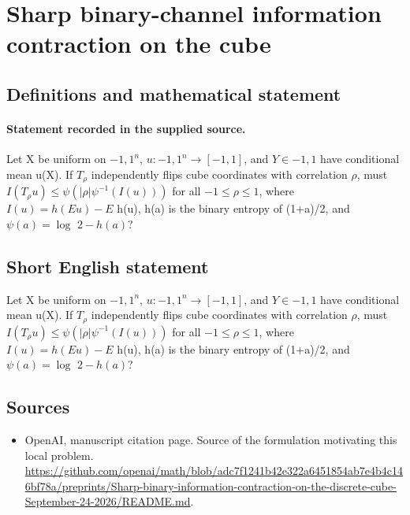 \documentclass[11pt]{article}
\begin{document}
\section*{Sharp binary-channel information contraction on the cube}\label{statement}
\subsection{Definitions and mathematical statement}
\paragraph{Statement recorded in the supplied source.}
Let X be uniform on ${-1,1}^n$, $u:{-1,1}^n\to [-1,1]$, and $Y\in {-1,1}$ have conditional mean u(X). If $T_\rho $ independently flips cube coordinates with correlation $\rho $, must $I(T_\rho u)\leq \psi (|\rho |\psi ^{-1}(I(u)))$ for all $-1\leq \rho \leq 1$, where $I(u)=h(Eu)-E$ h(u), h(a) is the binary entropy of (1+a)/2, and $\psi (a)=\log $ $2-h(a)$?
\subsection{Short English statement}
Let X be uniform on ${-1,1}^n$, $u:{-1,1}^n\to [-1,1]$, and $Y\in {-1,1}$ have conditional mean u(X). If $T_\rho $ independently flips cube coordinates with correlation $\rho $, must $I(T_\rho u)\leq \psi (|\rho |\psi ^{-1}(I(u)))$ for all $-1\leq \rho \leq 1$, where $I(u)=h(Eu)-E$ h(u), h(a) is the binary entropy of (1+a)/2, and $\psi (a)=\log $ $2-h(a)$?
\subsection{Sources}
\begin{itemize}
\item[S1] OpenAI, manuscript citation page. Source of the formulation motivating this local problem.
\url{https://github.com/openai/math/blob/adc7f1241b42e322a6451854ab7e4b4c146bf78a/preprints/Sharp-binary-information-contraction-on-the-discrete-cube-September-24-2026/README.md}.
\end{itemize}
\end{document}
